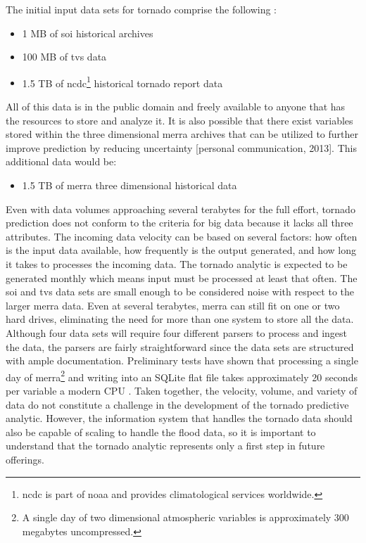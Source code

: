 The initial input data sets for tornado comprise the following \cite{walker}:
\begin{itemize}
    \item 1 MB of \gls{soi} historical archives \cite{bom}
    \item 100 MB of \gls{tvs} data \cite{hdss}
    \item 1.5 TB of \gls{ncdc}\footnote{\gls{ncdc} is part of \gls{noaa} and provides climatological services worldwide.} historical tornado report data\cite{ncdc}
\end{itemize}
All of this data is in the public domain and freely available to anyone that has the resources to store and analyze it. It is also possible that there exist variables stored within the three dimensional \gls{merra} archives that can be utilized to further improve prediction by reducing uncertainty [personal communication, 2013]. This additional data would be:
\begin{itemize}
    \item 1.5 TB of \gls{merra} three dimensional historical data \cite{mdisc}
\end{itemize}
Even with data volumes approaching several terabytes for the full effort, tornado prediction does not conform to the criteria for big data because it lacks all three attributes. The incoming data velocity can be based on several factors: how often is the input data available, how frequently is the output generated, and how long it takes to processes the incoming data. The tornado analytic is expected to be generated monthly which means input must be processed at least that often. The \gls{soi} and \gls{tvs} data sets are small enough to be considered noise with respect to the larger \gls{merra} data. Even at several terabytes, \gls{merra} can still fit on one or two hard drives, eliminating the need for more than one system to store all the data.  Although four data sets will require four different parsers to process and ingest the data, the parsers are fairly straightforward since the data sets are structured with ample documentation. Preliminary tests have shown that processing a single day of \gls{merra}\footnote{A single day of two dimensional atmospheric variables is approximately 300 megabytes uncompressed.} and writing into an SQLite flat file takes approximately 20 seconds per variable a modern CPU \cite{keller1}. Taken together, the velocity, volume, and variety of data do not constitute a challenge in the development of the tornado predictive analytic. However, the information system that handles the tornado data should also be capable of scaling to handle the flood data, so it is important to understand that the tornado analytic represents only a first step in future offerings.\\

